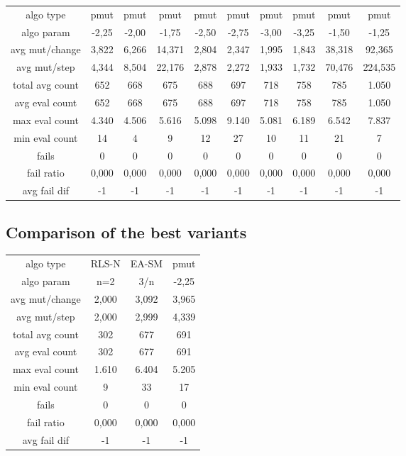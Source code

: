 \begin{tabular}[h]{cccccccccc}
algo type&           pmut&    pmut&    pmut&    pmut&    pmut&    pmut&    pmut&    pmut&    pmut\\
algo param&         -2,25&   -2,00&   -1,75&   -2,50&   -2,75&   -3,00&   -3,25&   -1,50&   -1,25\\
avg mut/change&     3,822&   6,266&  14,371&   2,804&   2,347&   1,995&   1,843&  38,318&  92,365\\
avg mut/step&       4,344&   8,504&  22,176&   2,878&   2,272&   1,933&   1,732&  70,476& 224,535\\
\hline
total avg count&      652&     668&     675&     688&     697&     718&     758&     785&   1.050\\
avg eval count&       652&     668&     675&     688&     697&     718&     758&     785&   1.050\\
max eval count&     4.340&   4.506&   5.616&   5.098&   9.140&   5.081&   6.189&   6.542&   7.837\\
min eval count&        14&       4&       9&      12&      27&      10&      11&      21&       7\\
\hline
fails&                  0&       0&       0&       0&       0&       0&       0&       0&       0\\
fail ratio&         0,000&   0,000&   0,000&   0,000&   0,000&   0,000&   0,000&   0,000&   0,000\\
avg fail dif&          -1&      -1&      -1&      -1&      -1&      -1&      -1&      -1&      -1\\
\end{tabular}


\subsection{Comparison of the best variants}


\begin{tabular}[h]{cccc}
algo type&        RLS-N& EA-SM&  pmut\\
algo param&         n=2&   3/n& -2,25\\
avg mut/change&   2,000& 3,092& 3,965\\
avg mut/step&     2,000& 2,999& 4,339\\
\hline
total avg count&    302&   677&   691\\
avg eval count&     302&   677&   691\\
max eval count&   1.610& 6.404& 5.205\\
min eval count&       9&    33&    17\\
\hline
fails&                0&     0&     0\\
fail ratio&       0,000& 0,000& 0,000\\
avg fail dif&        -1&    -1&    -1\\
\end{tabular}

